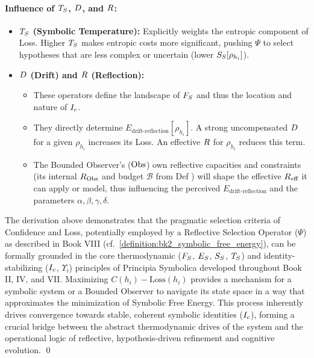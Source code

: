 \paragraph{Influence of \(T_S\), \(D\), and \(R\):}
\begin{itemize}
    \item \textbf{\(T_S\) (Symbolic Temperature):} Explicitly weights the entropic component of Loss. Higher \(T_S\) makes entropic costs more significant, pushing $\Psi$ to select hypotheses that are less complex or uncertain (lower \(S_S[\rho_{h_i}]\)).
    \item \textbf{\(D\) (Drift) and \(R\) (Reflection):}
    \begin{itemize}
        \item These operators define the landscape of \(F_S\) and thus the location and nature of \(I_c\).
        \item They directly determine \(E_{\text{drift-reflection}}[\rho_{h_i}]\). A strong uncompensated \(D\) for a given \(\rho_{h_i}\) increases its Loss. An effective \(R\) for \(\rho_{h_i}\) reduces this term.
        \item The Bounded Observer's ($\mathrm{Obs}$) own reflective capacities and constraints (its internal \(R_{\mathrm{Obs}}\) and budget $\mathcal{B}$ from Def ) will shape the effective \(R_{\text{eff}}\) it can apply or model, thus influencing the perceived \(E_{\text{drift-reflection}}\) and the parameters \(\alpha, \beta, \gamma, \delta\).
    \end{itemize}
\end{itemize}
\begin{scholium}
\label{scholium:bk7_reflective_selection_as_principled_convergence}
The derivation above demonstrates that the pragmatic selection criteria of Confidence and Loss, potentially employed by a Reflective Selection Operator ($\Psi$) as described in Book VIII (cf.~\ref{definition:bk2_symbolic_free_energy}), can be formally grounded in the core thermodynamic (\(F_S\), \(E_S\), \(S_S\), \(T_S\)) and identity-stabilizing (\(I_c\), \(\Upsilon_i\)) principles of Principia Symbolica developed throughout Book II, IV, and VII. Maximizing \(C(h_i) - \text{Loss}(h_i)\) provides a mechanism for a symbolic system or a Bounded Observer to navigate its state space in a way that approximates the minimization of Symbolic Free Energy. This process inherently drives convergence towards stable, coherent symbolic identities (\(I_c\)), forming a crucial bridge between the abstract thermodynamic drives of the system and the operational logic of reflective, hypothesis-driven refinement and cognitive evolution.
\qed \end{scholium}
